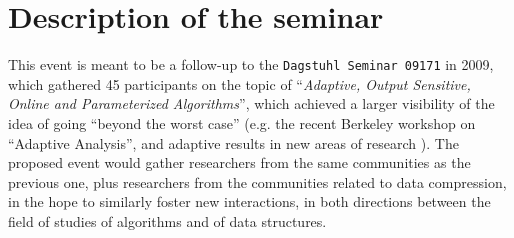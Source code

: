 \documentclass[a4paper,10pt]{article}
\begin{document}
% 
% 



\section{Description of the seminar}

\begin{INUTILE}
This event is meant to be a follow-up to the \texttt{Dagstuhl Seminar 09171} in 2009, which gathered 45 participants on the topic of ``\emph{Adaptive, Output Sensitive, Online and Parameterized Algorithms}'', which achieved a larger visibility of the idea of going ``beyond the worst case'' (e.g. the recent Berkeley workshop on ``Adaptive Analysis'', and adaptive results in new areas of research \cite{2015-SPIRE-AdaptiveComputationOfTheSwapInsertCorrectionDistance-BarbayPerez}). The proposed event would gather researchers from the same communities as the previous one, plus researchers from the communities related to data compression, in the hope to similarly foster new interactions, in both directions between the field of studies of algorithms and of data structures.
\end{INUTILE}
\end{document}
